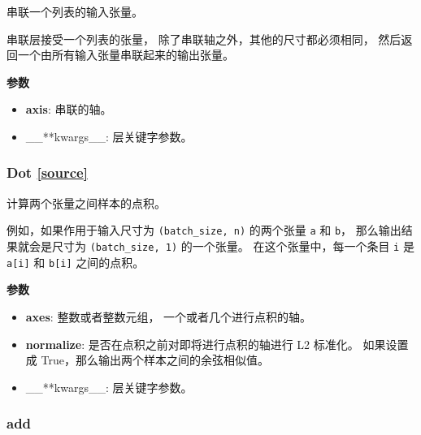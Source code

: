 串联一个列表的输入张量。

串联层接受一个列表的张量， 除了串联轴之外，其他的尺寸都必须相同，
然后返回一个由所有输入张量串联起来的输出张量。

\textbf{参数}

\begin{itemize}
\tightlist
\item
  \textbf{axis}: 串联的轴。
\item
  \_\_**kwargs\_\_: 层关键字参数。
\end{itemize}




\subsubsection{Dot {\href{https://github.com/keras-team/keras/blob/master/keras/layers/merge.py\#L408}{{[}source{]}}}}

\begin{Shaded}
\begin{Highlighting}[]
\OperatorTok{=}\NormalTok{)}
\end{Highlighting}
\end{Shaded}

计算两个张量之间样本的点积。

例如，如果作用于输入尺寸为 \texttt{(batch\_size,\ n)} 的两个张量
\texttt{a} 和 \texttt{b}， 那么输出结果就会是尺寸为
\texttt{(batch\_size,\ 1)} 的一个张量。 在这个张量中，每一个条目
\texttt{i} 是 \texttt{a{[}i{]}} 和 \texttt{b{[}i{]}} 之间的点积。

\textbf{参数}

\begin{itemize}
\tightlist
\item
  \textbf{axes}: 整数或者整数元组， 一个或者几个进行点积的轴。
\item
  \textbf{normalize}: 是否在点积之前对即将进行点积的轴进行 L2 标准化。
  如果设置成 True，那么输出两个样本之间的余弦相似值。
\item
  \_\_**kwargs\_\_: 层关键字参数。
\end{itemize}


\subsubsection{add}\label{add}

\begin{Shaded}
\begin{Highlighting}[]
\end{Highlighting}
\end{Shaded}

